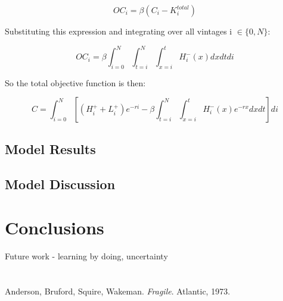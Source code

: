 \documentclass[singlespace]{easychithesis}
\begin{document}
\begin{equation}
OC_i = \beta (C_i - K^{total}_i)
\end{equation}


Substituting this expression and integrating over all vintages  i $\in \{0,N\}$:

\begin{equation}
OC_i = \beta \int_{i=0}^N \int_{t=i}^N \int_{x=i}^t H^-_i(x) dx dt di
\end{equation}

So the total objective function is then:

\begin{equation}
C = \int_{i=0}^N  \left[ (H^+_i + L^+_i)e^{-ri}  - \beta  \int_{t=i}^N \int_{x=i}^t H^-_i(x)e^{-rx} dx dt\right] di
\end{equation}






\section{Model Results}

\section{Model Discussion}



\chapter{Conclusions}

Future work - learning by doing, uncertainty


%
%
\appendix
\chapter{}

\chapter{}



\singlespacing
\pagebreak
{}

\begin{thebibliography}{99}
Anderson, Bruford, Squire, Wakeman.  \emph{Fragile}.
  Atlantic, 1973.
\end{thebibliography}
\end{document}
